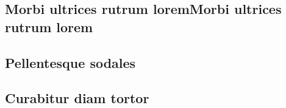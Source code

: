 \documentclass[
	12pt,				%
    oneside,            %
	a4paper,			%
	english,			%
	brazilian,		    %
	]{AcademicoUFT}
\begin{document}
\begin{anexosenv}
\partanexos %

\chapter{Morbi ultrices rutrum loremMorbi ultrices rutrum lorem}

\section{Pellentesque sodales}
\lipsum[40] %

\section{Curabitur diam tortor}
\lipsum[54] %
\end{anexosenv}
\end{document}
